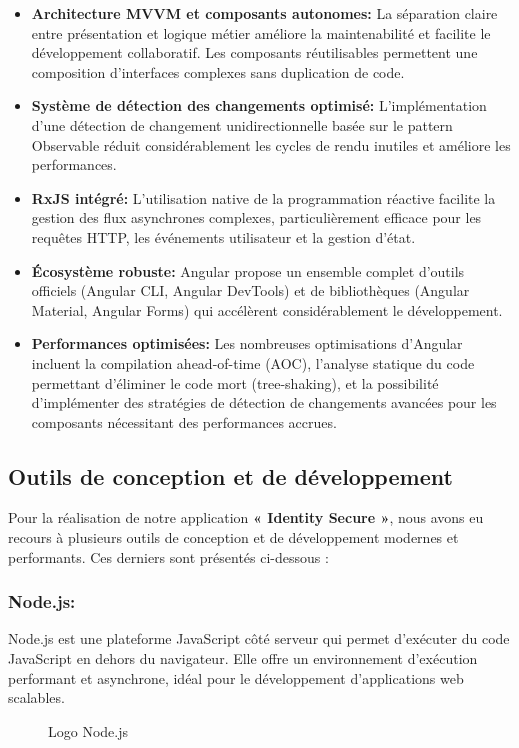  \begin{itemize}
    \item \textbf{Architecture MVVM et composants autonomes:} La séparation claire entre présentation et logique métier améliore la maintenabilité et facilite le développement collaboratif. Les composants réutilisables permettent une composition d'interfaces complexes sans duplication de code.

    \item \textbf{Système de détection des changements optimisé:} L'implémentation d'une détection de changement unidirectionnelle basée sur le pattern Observable réduit considérablement les cycles de rendu inutiles et améliore les performances.

    \item \textbf{RxJS intégré:} L'utilisation native de la programmation réactive facilite la gestion des flux asynchrones complexes, particulièrement efficace pour les requêtes HTTP, les événements utilisateur et la gestion d'état.

    \item \textbf{Écosystème robuste:} Angular propose un ensemble complet d'outils officiels (Angular CLI, Angular DevTools) et de bibliothèques (Angular Material, Angular Forms) qui accélèrent considérablement le développement.

    \item \textbf{Performances optimisées:} Les nombreuses optimisations d'Angular incluent la compilation ahead-of-time (AOC), l'analyse statique du code permettant d'éliminer le code mort (tree-shaking), et la possibilité d'implémenter des stratégies de détection de changements avancées pour les composants nécessitant des performances accrues.
 \end{itemize}



 \subsection{Outils de conception et de développement}
Pour la réalisation de notre application \textbf{« Identity Secure »}, nous avons eu recours à plusieurs outils de conception et de développement modernes et performants. Ces derniers sont présentés ci-dessous :

\subsubsection*{Node.js:}
Node.js \cite{b6}est une plateforme JavaScript côté serveur qui permet d'exécuter du code JavaScript en dehors du navigateur. Elle offre un environnement d'exécution performant et asynchrone, idéal pour le développement d'applications web scalables.
\begin{figure}[H]
\centering
{}
\caption{Logo Node.js}
\end{figure}


